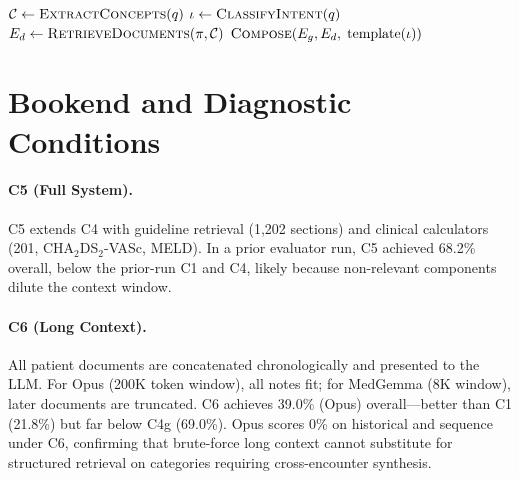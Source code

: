 \begin{algorithm}[ht]
\caption{Intent-Aware Retrieval (C4g)}\label{alg:c4g}
$\mathcal{C} \gets \textsc{ExtractConcepts}(q)$ 
$\iota \gets \textsc{ClassifyIntent}(q)$ 
$E_d \gets \textsc{RetrieveDocuments}(\pi, \mathcal{C})$\;
\Return $\textsc{Compose}(E_g, E_d,\; \text{template}(\iota))$\;
\end{algorithm}


\section{Bookend and Diagnostic Conditions}
\label{app:c5}

\paragraph{C5 (Full System).}
C5 extends C4 with guideline retrieval (1{,}202 sections) and clinical calculators (201, \eg CHA$_2$DS$_2$-VASc, MELD).
In a prior evaluator run, C5 achieved 68.2\% overall, below the prior-run C1 and C4, likely because non-relevant components dilute the context window.

\paragraph{C6 (Long Context).}
All patient documents are concatenated chronologically and presented to the LLM.
For Opus (200K token window), all notes fit; for MedGemma (8K window), later documents are truncated.
C6 achieves 39.0\% (Opus) overall---better than C1 (21.8\%) but far below C4g (69.0\%).
Opus scores 0\% on historical and sequence under C6, confirming that brute-force long context cannot substitute for structured retrieval on categories requiring cross-encounter synthesis.

